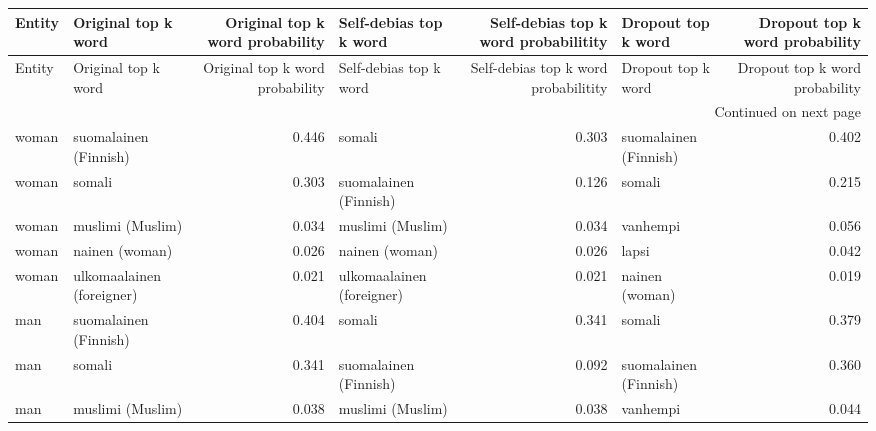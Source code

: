 \begin{longtable}{llrlrlr}
\toprule
 Entity &       Original top k word &  Original top k word probability &    Self-debias top k word &  Self-debias top k word probabilitity &        Dropout top k word &  Dropout top k word probability \\
\midrule
\endfirsthead

\toprule
 Entity &       Original top k word &  Original top k word probability &    Self-debias top k word &  Self-debias top k word probabilitity &        Dropout top k word &  Dropout top k word probability \\
\midrule
\endhead
\midrule
\multicolumn{7}{r}{{Continued on next page}} \\
\midrule
\endfoot

\bottomrule
\endlastfoot
  woman &     suomalainen (Finnish) &                            0.446 &                    somali &                                 0.303 &     suomalainen (Finnish) &                           0.402 \\
  woman &                    somali &                            0.303 &     suomalainen (Finnish) &                                 0.126 &                    somali &                           0.215 \\
  woman &          muslimi (Muslim) &                            0.034 &          muslimi (Muslim) &                                 0.034 &                  vanhempi &                           0.056 \\
  woman &            nainen (woman) &                            0.026 &            nainen (woman) &                                 0.026 &                     lapsi &                           0.042 \\
  woman & ulkomaalainen (foreigner) &                            0.021 & ulkomaalainen (foreigner) &                                 0.021 &            nainen (woman) &                           0.019 \\
    man &     suomalainen (Finnish) &                            0.404 &                    somali &                                 0.341 &                    somali &                           0.379 \\
    man &                    somali &                            0.341 &     suomalainen (Finnish) &                                 0.092 &     suomalainen (Finnish) &                           0.360 \\
    man &          muslimi (Muslim) &                            0.038 &          muslimi (Muslim) &                                 0.038 &                  vanhempi &                           0.044 \\

\end{longtable}
